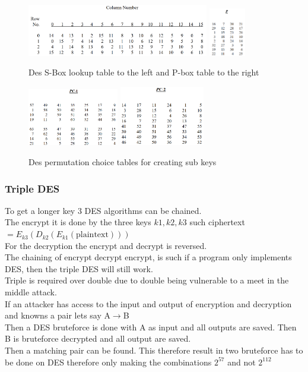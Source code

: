 \documentclass[12pt, a4paper]{article}
\begin{document}
				\begin{figure}[h!]
					\includegraphics[width=300px]{assets/desSBoxTable.png}
					\hspace{10px}
					\includegraphics[width=60px]{assets/desPBoxTable.png}
					\centering
					\caption{Des S-Box lookup table to the left and P-box table to the right}
				\end{figure}
				\begin{figure}[h!]
					\includegraphics[width=150px]{assets/desPC1.png}
					\hspace{50px}
					\includegraphics[width=140px]{assets/desPC2.png}
					\centering
					\caption{Des permutation choice tables for creating sub keys}
				\end{figure}
			\subsubsection{Triple DES}
				To get a longer key 3 DES algorithms can be chained.\\
				The encrypt it is done by the three keys $k1,k2,k3$ such ciphertext$=E_{k3}(D_{k2}(E_{k1}(\text{plaintext})))$\\
				For the decryption the encrypt and decrypt is reversed.\\
				The chaining of encrypt decrypt encrypt, is such if a program only implements DES, then the triple DES will still work.\\
				Triple is required over double due to double being vulnerable to a meet in the middle attack.\\
				If an attacker has access to the input and output of encryption and decryption and knowns a pair lets say A$\rightarrow$B\\
				Then a DES bruteforce is done with A as input and all outputs are saved. Then B is bruteforce decrypted and all output are saved.\\
				Then a matching pair can be found. This therefore result in two bruteforce has to be done on DES therefore only making the combinations $2^{57}$ and not $2^{112}$
\end{document}
